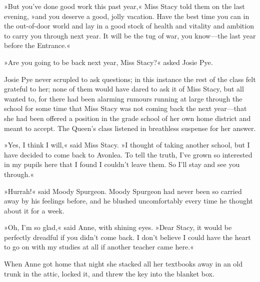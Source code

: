 »But you've done good work this past year,« Miss Stacy told them on the last evening, »and you deserve a good, jolly vacation. Have the best time you can in the out-of-door world and lay in a good stock of health and vitality and ambition to carry you through next year. It will be the tug of war, you know—the last year before the Entrance.«

»Are you going to be back next year, Miss Stacy?« asked Josie Pye.

Josie Pye never scrupled to ask questions; in this instance the rest of the class felt grateful to her; none of them would have dared to ask it of Miss Stacy, but all wanted to, for there had been alarming rumours running at large through the school for some time that Miss Stacy was not coming back the next year—that she had been offered a position in the grade school of her own home district and meant to accept. The Queen's class listened in breathless suspense for her answer.

»Yes, I think I will,« said Miss Stacy. »I thought of taking another school, but I have decided to come back to Avonlea. To tell the truth, I've grown so interested in my pupils here that I found I couldn't leave them. So I'll stay and see you through.«

»Hurrah!« said Moody Spurgeon. Moody Spurgeon had never been so carried away by his feelings before, and he blushed uncomfortably every time he thought about it for a week.

»Oh, I'm so glad,« said Anne, with shining eyes. »Dear Stacy, it would be perfectly dreadful if you didn't come back. I don't believe I could have the heart to go on with my studies at all if another teacher came here.«

When Anne got home that night she stacked all her textbooks away in an old trunk in the attic, locked it, and threw the key into the blanket box.

